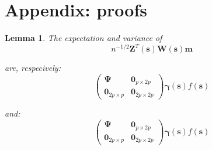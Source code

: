 \documentclass[authoryear, review, 11pt]{elsarticle}
\newtheorem{lemma}[theorem]{Lemma}
\begin{document}
    \section{Appendix: proofs}
        \begin{lemma}
            The expectation and variance of
            \begin{equation}
                n^{-1/2} \bm{Z}^T(\bm{s}) \bm{W}(\bm{s}) \bm{m}
            \end{equation}

            are, respecively:
            \begin{equation*}
                \left( \begin{array}{cc} \bm{\Psi}  & \bm{0}_{p \times 2p} \\ \bm{0}_{2p \times p} & \bm{0}_{2p \times 2p} \end{array} \right) \bm{\gamma}(\bm{s}) f(\bm{s})
            \end{equation*}
    
            and:
            \begin{equation*}
                \left( \begin{array}{cc} \bm{\Psi}  & \bm{0}_{p \times 2p} \\ \bm{0}_{2p \times p} & \bm{0}_{2p \times 2p} \end{array} \right) \bm{\gamma}(\bm{s}) f(\bm{s})
            \end{equation*}
        \end{lemma}
\end{document}
